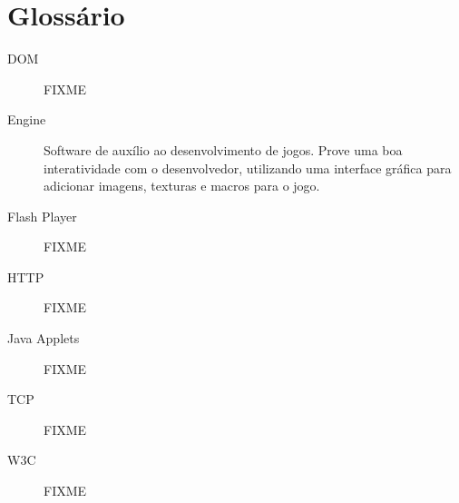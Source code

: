 
\section*{Glossário}

\begin{description}
\item[DOM ] FIXME
\item[Engine ] Software de auxílio ao desenvolvimento de jogos. Prove
uma boa interatividade com o desenvolvedor, utilizando uma interface
gráfica para adicionar imagens, texturas e macros para o jogo.
\item[Flash Player ] FIXME
\item[HTTP ] FIXME
\item[Java Applets ] FIXME
\item[TCP ] FIXME
\item[W3C ] FIXME

\end{description}

\newpage
